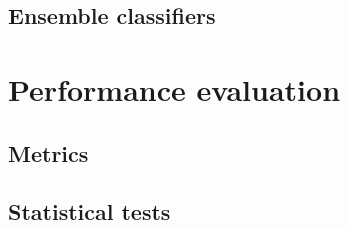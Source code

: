 \subsection{Ensemble classifiers}

\section{Performance evaluation} %
\label{sec:perfeval}

\subsection{Metrics}

\subsection{Statistical tests}
